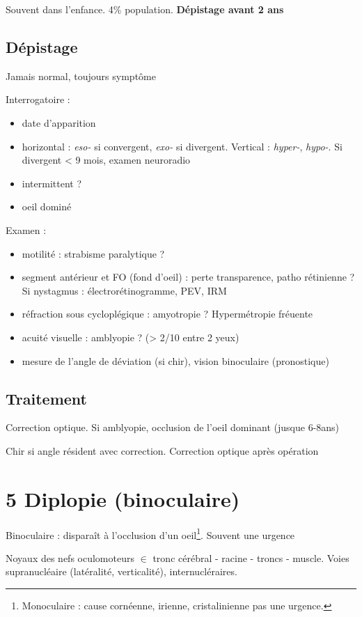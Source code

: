 \documentclass[11pt]{article}
\begin{document}
Souvent dans l'enfance. 4\% population. \textbf{Dépistage avant 2 ans}

\subsection{Dépistage}
\label{sec:org4ad6b56}
Jamais normal, toujours symptôme

Interrogatoire :
\begin{itemize}
\item date d'apparition
\item horizontal : \emph{eso-} si convergent, \emph{exo-} si divergent. Vertical : \emph{hyper-},
\emph{hypo-}. Si divergent < 9 mois, examen neuroradio
\item intermittent ?
\item oeil dominé
\end{itemize}

Examen : 
\begin{itemize}
\item motilité : strabisme paralytique ?
\item segment antérieur et FO (fond d'oeil) : perte transparence, patho rétinienne ? Si nystagmus : électrorétinogramme, PEV, IRM
\item réfraction sous cycloplégique : amyotropie ? Hypermétropie fréuente
\item acuité visuelle : amblyopie ? (> 2/10 entre 2 yeux)
\item mesure de l'angle de déviation (si chir), vision binoculaire (pronostique)
\end{itemize}

\subsection{Traitement}
\label{sec:org401df94}
Correction optique. Si amblyopie, occlusion de l'oeil dominant (jusque 6-8ans)

Chir si angle résident avec correction. Correction optique après opération
\section{5 Diplopie (binoculaire)}
\label{sec:orgdea56ae}
Binoculaire : disparaît à l'occlusion d'un oeil\footnote{Monoculaire : cause cornéenne, irienne, cristalinienne \thus pas une urgence.}. Souvent une urgence
\danger

Noyaux des nefs oculomoteurs \(\in\) tronc cérébral - racine - troncs -
muscle. Voies supranucléaire (latéralité, verticalité), internucléraires.
\end{document}
